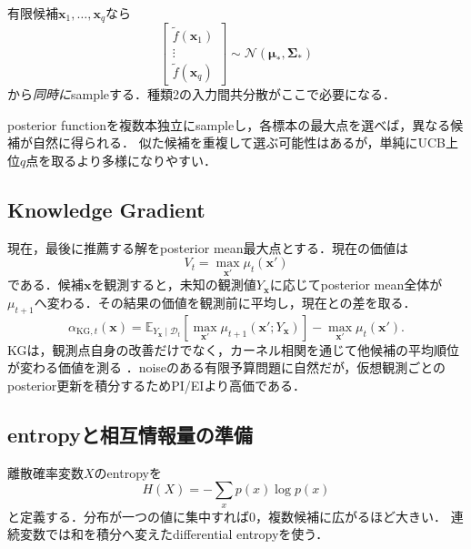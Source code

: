 \documentclass[a4paper,11pt]{ltjsarticle}
\newcommand{\E}{\mathbb E}
\newcommand{\N}{\mathcal N}
\newcommand{\D}{\mathcal D}
\begin{document}
有限候補\(\bm x_1,\ldots,\bm x_q\)なら
\begin{equation}
  \begin{bmatrix}
  \widetilde f(\bm x_1)\\\vdots\\\widetilde f(\bm x_q)
  \end{bmatrix}
  \sim\N(\bm\mu_*,\bm\Sigma_*)
\end{equation}
から\emph{同時に}sampleする．種類2の入力間共分散がここで必要になる．

\begin{intuitionbox}[並列探索との相性]
posterior functionを複数本独立にsampleし，各標本の最大点を選べば，異なる候補が自然に得られる．
似た候補を重複して選ぶ可能性はあるが，単純にUCB上位\(q\)点を取るより多様になりやすい．
\end{intuitionbox}

\subsection{Knowledge Gradient}
\label{sec:knowledge-gradient}

現在，最後に推薦する解をposterior mean最大点とする．現在の価値は
\begin{equation}
  V_t=\max_{\bm x'}\mu_t(\bm x')
\end{equation}
である．候補\(\bm x\)を観測すると，未知の観測値\(Y_{\bm x}\)に応じてposterior mean全体が
\(\mu_{t+1}\)へ変わる．その結果の価値を観測前に平均し，現在との差を取る．
\begin{equation}
  \boxed{
  \alpha_{\mathrm{KG},t}(\bm x)
  =\E_{Y_{\bm x}\mid\D_t}\left[
  \max_{\bm x'}\mu_{t+1}(\bm x';Y_{\bm x})
  \right]
  -\max_{\bm x'}\mu_t(\bm x').}
  \label{eq:knowledge-gradient}
\end{equation}
KGは，観測点自身の改善だけでなく，カーネル相関を通じて他候補の平均順位が変わる価値を測る
\citep{frazier2009kg}．noiseのある有限予算問題に自然だが，仮想観測ごとのposterior更新を積分するためPI/EIより高価である．

\subsection{entropyと相互情報量の準備}

離散確率変数\(X\)のentropyを
\begin{equation}
  H(X)=-\sum_x p(x)\log p(x)
  \label{eq:discrete-entropy}
\end{equation}
と定義する．分布が一つの値に集中すれば0，複数候補に広がるほど大きい．
連続変数では和を積分へ変えたdifferential entropyを使う．
\end{document}
